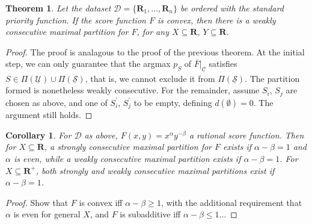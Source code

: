 \documentclass{article}
\newtheorem{thm}{Theorem}
\newtheorem{corollary}{Corollary}
\theoremstyle{case}
\begin{document}
\begin{thm} \label{thm2}
Let the dataset $\mathcal{D} = \{ \mathbf{R}_1, \ldots, \mathbf{R}_n \}$ be ordered with the standard priority function. If the score function $F$ is convex, then there is a weakly consecutive maximal partition for $F$, for any $X \subseteq \mathbf{R}$, $Y \subseteq \mathbf{R}$.
\end{thm}
\begin{proof}
The proof is analagous to the proof of the previous theorem. At the initial step, we can only guarantee that the argmax $p_S$ of $\overline{F} |_{\underline{\mathcal{C}}}$ satisfies $S \in \Pi\left( \underline{\mathcal{U}}\right) \cup \Pi\left( \underline{\mathcal{S}}\right)$, that is, we cannot exclude it from $\Pi\left( \underline{\mathcal{S}}\right)$. The partition formed is nonetheless weakly consecutive. For the remainder, assume $S_i$, $S_j$ are chosen as above, and one of  $S^{\prime}_i$, $S^{\prime}_j$ to be empty, defining $d(\emptyset) = 0$. The argument still holds.
\end{proof}

\begin{corollary}
For $\mathcal{D}$ as above, $F(x,y) = x^{\alpha}y^{-\beta}$ a rational score function. Then for $X \subseteq \mathbf{R}$, a strongly consecutive maximal partition for $F$ exists if $\alpha - \beta = 1$ and $\alpha$ is even, while a weakly consecutive maximal partition exists if $\alpha - \beta = 1$. For $X \subseteq \mathbf{R}^+$, both strongly and weakly consecutive maximal partitions exist if $\alpha - \beta = 1$.
\end{corollary}
\begin{proof}

Show that $F$ is convex iff $\alpha - \beta \geq 1$, with the additional requirement that $\alpha$ is even for general $X$, and $F$ is subadditive iff $\alpha - \beta \leq 1$...
\end{proof}
\end{document}
